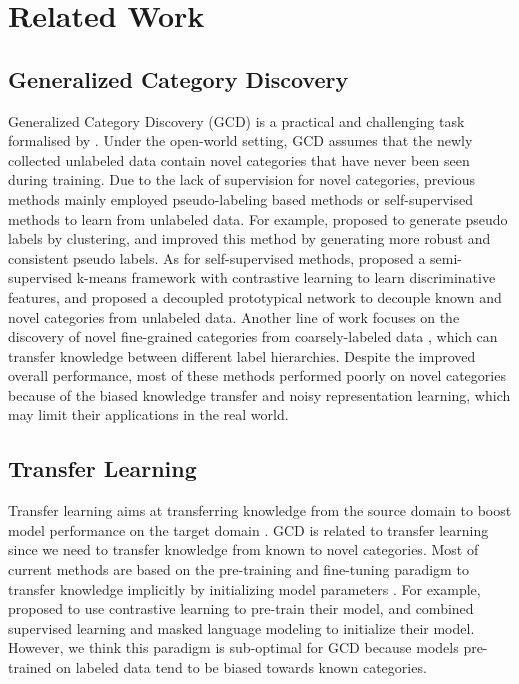 \documentclass[letterpaper]{article} %
\begin{document}
\section{Related Work}
\subsection{Generalized Category Discovery}
Generalized Category Discovery (GCD) is a practical and challenging task formalised by \citet{gcd}. Under the open-world setting, GCD assumes that the newly collected unlabeled data contain novel categories that have never been seen during training. Due to the lack of supervision for novel categories, previous methods mainly employed pseudo-labeling based methods \citep{dtc,thu2020,mutual} or self-supervised methods \citep{ncl,simple,mtp} to learn from unlabeled data. For example, \citet{deepcluster} proposed to generate pseudo labels by clustering, \citet{thu2021} and \citet{ptjn} improved this method by generating more robust and consistent pseudo labels. As for self-supervised methods, \citet{gcd} proposed a semi-supervised k-means framework with contrastive learning to learn discriminative features, and \citet{dpn} proposed a decoupled prototypical network to decouple known and novel categories from unlabeled data.
Another line of work focuses on the discovery of novel fine-grained categories from coarsely-labeled data \citep{fcdc,dna,ner}, which can transfer knowledge between different label hierarchies.
Despite the improved overall performance, most of these methods performed poorly on novel categories because of the biased knowledge transfer and noisy representation learning, which may limit their applications in the real world.


\subsection{Transfer Learning}
Transfer learning aims at transferring knowledge from the source domain to boost model performance on the target domain \cite{transfer2,tail}. GCD is related to transfer learning since we need to transfer knowledge from known to novel categories. Most of current methods are based on the pre-training and fine-tuning paradigm to transfer knowledge implicitly by initializing model parameters \citep{thu2021}. For example, \citet{gcd} proposed to use contrastive learning to pre-train their model, and \citet{mtp} combined supervised learning and masked language modeling to initialize their model. 
However, we think this paradigm is sub-optimal for GCD because models pre-trained on labeled data tend to be biased towards known categories.
\end{document}
